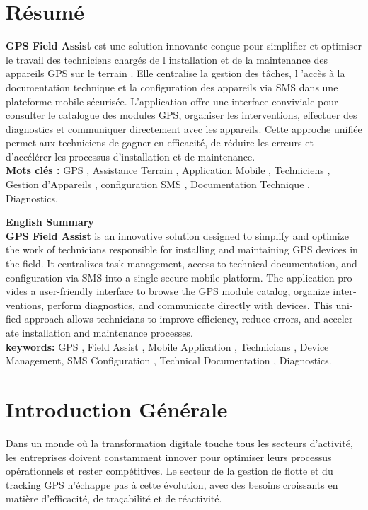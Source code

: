 \documentclass[12pt,a4paper]{report}
\begin{document}
\chapter*{Résumé}
\noindent \textbf{GPS Field Assist} est une solution innovante conçue pour simplifier et optimiser  le travail des techniciens chargés de l installation et de la maintenance des appareils GPS sur le terrain . Elle centralise la gestion des tâches, l 'accès à la documentation technique et la configuration des appareils via SMS dans une plateforme mobile sécurisée. L'application offre une interface conviviale pour consulter le catalogue des modules GPS, organiser les interventions, effectuer des diagnostics et communiquer directement avec les appareils. Cette approche unifiée permet aux techniciens de gagner en efficacité, de réduire les erreurs et d'accélérer les processus d'installation et de maintenance.\\[0.3cm]
\noindent \textbf{ Mots clés : } GPS , Assistance Terrain , Application Mobile , Techniciens , Gestion d'Appareils , configuration SMS , Documentation Technique , Diagnostics.\\[1cm]
\vspace{1cm}
\begin{otherlanguage}{english} 
\noindent \textbf{\Large English Summary}\\[0.3cm]
\noindent  \textbf{GPS Field Assist } is an innovative solution designed to simplify and optimize the work of technicians responsible for installing and maintaining GPS devices in the field. It centralizes task management, access to technical documentation, and configuration via SMS into a single secure mobile platform. The application provides a user-friendly interface to browse the GPS module catalog, organize interventions, perform diagnostics, and communicate directly with devices. This unified approach allows technicians to improve efficiency, reduce errors, and accelerate installation and maintenance processes.\\[0.4cm]
\noindent \textbf{keywords:} GPS , Field Assist , Mobile Application , Technicians , Device Management, SMS Configuration , Technical Documentation , Diagnostics.
\end{otherlanguage}







\chapter*{Introduction Générale}
\noindent Dans un monde où la transformation digitale touche tous les secteurs d'activité, les entreprises doivent constamment innover pour optimiser leurs processus opérationnels et rester compétitives. 
Le secteur de la gestion de flotte et du tracking GPS n'échappe pas à cette évolution, avec des besoins croissants en matière d'efficacité, de traçabilité et de réactivité.\\[0.3cm] 
\end{document}

